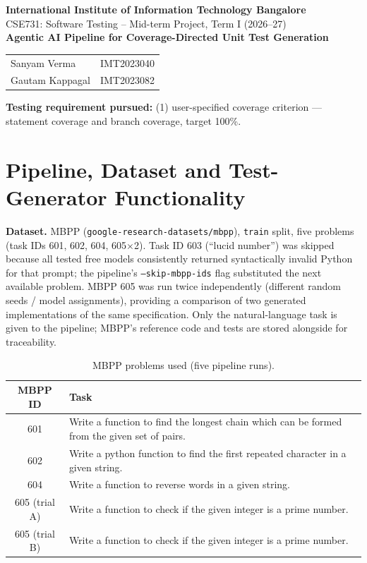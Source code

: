\documentclass[11pt,a4paper]{article}
\begin{document}
\begin{center}
{\large\bfseries International Institute of Information Technology Bangalore}\\[2pt]
CSE731: Software Testing \;--\; Mid-term Project, Term I (2026--27)\\[10pt]
{\LARGE\bfseries Agentic AI Pipeline for Coverage-Directed Unit Test Generation}\\[10pt]
\begin{tabular}{ll}
Sanyam Verma & IMT2023040\\
Gautam Kappagal & IMT2023082
\end{tabular}
\end{center}

\noindent\textbf{Testing requirement pursued:} (1) user-specified coverage criterion ---
statement coverage and branch coverage, target 100\%.

\section{Pipeline, Dataset and Test-Generator Functionality}

\textbf{Dataset.} MBPP (\texttt{google-research-datasets/mbpp}), \texttt{train} split,
five problems (task IDs 601, 602, 604, 605$\times$2). Task ID 603 (``lucid number'')
was skipped because all tested free models consistently returned syntactically invalid
Python for that prompt; the pipeline's \texttt{--skip-mbpp-ids} flag substituted the
next available problem. MBPP 605 was run twice independently (different random
seeds / model assignments), providing a comparison of two generated implementations of
the same specification. Only the natural-language task is given to the pipeline; MBPP's
reference code and tests are stored alongside for traceability.

\begin{table}[H]
\centering\small
\begin{tabularx}{\linewidth}{c X}
\toprule
MBPP ID & Task\\
\midrule
601 & Write a function to find the longest chain which can be formed from the given set of pairs.\\
602 & Write a python function to find the first repeated character in a given string.\\
604 & Write a function to reverse words in a given string.\\
605 (trial A) & Write a function to check if the given integer is a prime number.\\
605 (trial B) & Write a function to check if the given integer is a prime number.\\
\bottomrule
\end{tabularx}
\caption{MBPP problems used (five pipeline runs).}
\end{table}
\end{document}
